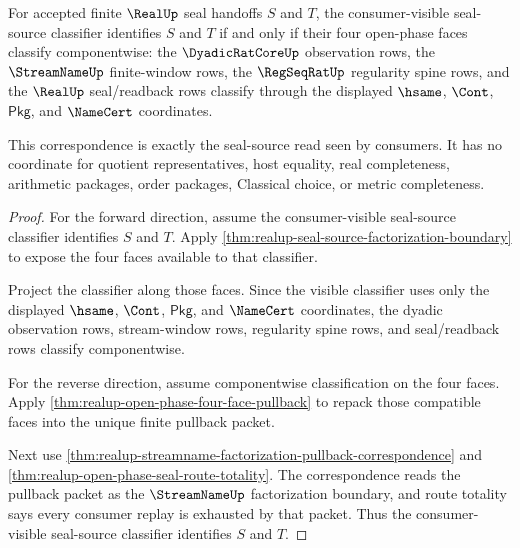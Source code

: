 \begin{theorem}
\label{thm:realup-seal-source-classifier-correspondence}
For accepted finite $\RealUp$ seal handoffs $S$ and $T$, the consumer-visible
seal-source classifier identifies $S$ and $T$ if and only if their four
open-phase faces classify componentwise: the $\DyadicRatCoreUp$ observation
rows, the $\StreamNameUp$ finite-window rows, the $\RegSeqRatUp$ regularity
spine rows, and the $\RealUp$ seal/readback rows classify through the displayed
$\hsame$, $\Cont$, $\mathsf{Pkg}$, and $\NameCert$ coordinates.

This correspondence is exactly the seal-source read seen by consumers. It has
no coordinate for quotient representatives, host equality, real completeness,
arithmetic packages, order packages, Classical choice, or metric completeness.
\end{theorem}
\begin{proof}
For the forward direction, assume the consumer-visible seal-source classifier
identifies $S$ and $T$. Apply
\autoref{thm:realup-seal-source-factorization-boundary} to expose the four
faces available to that classifier.

Project the classifier along those faces. Since the visible classifier uses only
the displayed $\hsame$, $\Cont$, $\mathsf{Pkg}$, and $\NameCert$ coordinates,
the dyadic observation rows, stream-window rows, regularity spine rows, and
seal/readback rows classify componentwise.

For the reverse direction, assume componentwise classification on the four
faces. Apply \autoref{thm:realup-open-phase-four-face-pullback} to repack those
compatible faces into the unique finite pullback packet.

Next use
\autoref{thm:realup-streamname-factorization-pullback-correspondence} and
\autoref{thm:realup-open-phase-seal-route-totality}. The correspondence reads
the pullback packet as the $\StreamNameUp$ factorization boundary, and route
totality says every consumer replay is exhausted by that packet. Thus the
consumer-visible seal-source classifier identifies $S$ and $T$.
\end{proof}


